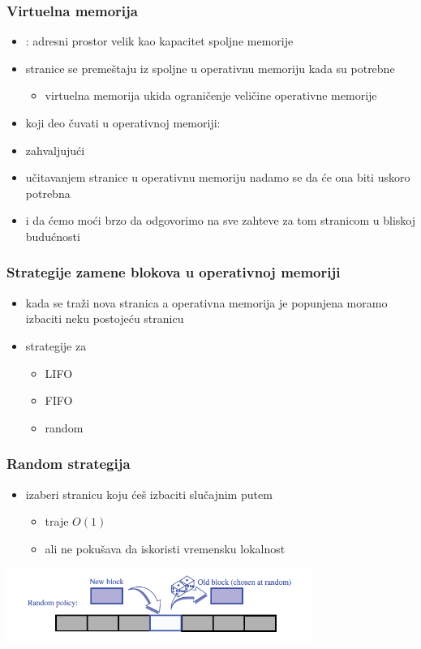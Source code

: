 \documentclass[compress,aspectratio=169]{beamer}
\begin{document}
\begin{frame}[fragile]
  \frametitle{Virtuelna memorija}
  \begin{itemize}
    \item {}: adresni prostor velik kao 
    kapacitet spoljne memorije
    \item stranice se premeštaju iz spoljne u operativnu memoriju kada 
    su potrebne
    \begin{itemize}
      \item virtuelna memorija ukida ograničenje veličine operativne 
      memorije
    \end{itemize}
    \item koji deo čuvati u operativnoj memoriji: 
    \item zahvaljujući 
    \item učitavanjem stranice u operativnu memoriju nadamo se da će ona
    biti uskoro potrebna
    \item i da ćemo moći brzo da odgovorimo na sve zahteve za tom
    stranicom u bliskoj budućnosti
  \end{itemize}
\end{frame}

\begin{frame}[fragile]
  \frametitle{Strategije zamene blokova u operativnoj memoriji}
  \begin{itemize}
    \item kada se traži nova stranica a operativna memorija je popunjena
    moramo izbaciti neku postojeću stranicu
    \item strategije za 
    \begin{itemize}
      \item LIFO
      \item FIFO
      \item random
    \end{itemize}
  \end{itemize}
\end{frame}

\begin{frame}[fragile]
  \frametitle{Random strategija}
  \begin{itemize}
    \item izaberi stranicu koju ćeš izbaciti slučajnim putem
    \begin{itemize}
      \item traje $O(1)$
      \item ali ne pokušava da iskoristi vremensku lokalnost
    \end{itemize}
  \end{itemize}
  \begin{center}
    \includegraphics[width=10cm]{asp-15-pic03.png}
  \end{center}
\end{frame}
\end{document}
